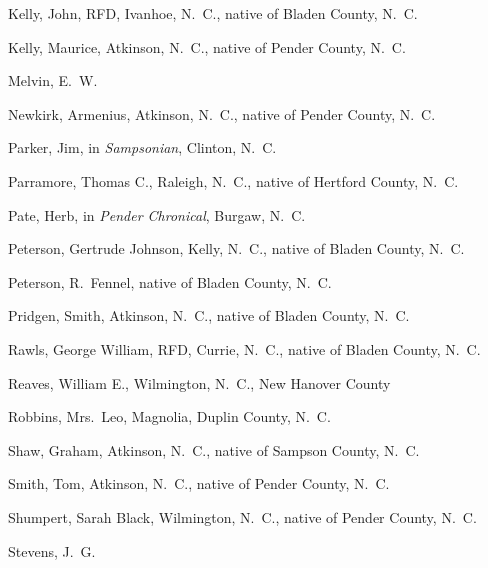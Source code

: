 \documentclass[11pt, a5paper, openright]{book}
\begin{document}
\begin{thebibliography}{99}
  Kelly, John, RFD, Ivanhoe, N.~C., native of Bladen County, N.~C.

  Kelly, Maurice, Atkinson, N.~C., native of Pender County, N.~C.

  Melvin, E.~W.

  Newkirk, Armenius, Atkinson, N.~C., native of Pender County, N.~C.

  Parker, Jim, in \textit{Sampsonian}, Clinton, N.~C.

  Parramore, Thomas C., Raleigh, N.~C., native of Hertford County, N.~C.

  Pate, Herb, in \textit{Pender Chronical}, Burgaw, N.~C.

  Peterson, Gertrude Johnson, Kelly, N.~C., native of Bladen County, N.~C.

  Peterson, R.~Fennel, native of Bladen County, N.~C.

  Pridgen, Smith, Atkinson, N.~C., native of Bladen County, N.~C.

  Rawls, George William, RFD, Currie, N.~C., native of Bladen County, N.~C.

  Reaves, William E., Wilmington, N.~C., New Hanover County

  Robbins, Mrs.~Leo, Magnolia, Duplin County, N.~C.

  Shaw, Graham, Atkinson, N.~C., native of Sampson County, N.~C.

  Smith, Tom, Atkinson, N.~C., native of Pender County, N.~C.

  Shumpert, Sarah Black, Wilmington, N.~C., native of Pender County, N.~C.

  Stevens, J.~G.


\end{thebibliography}
\end{document}

